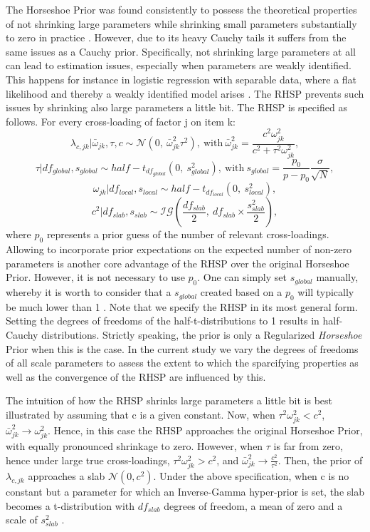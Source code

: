 \documentclass[]{interact}
\theoremstyle{plain}%
\theoremstyle{definition}
\theoremstyle{remark}
\begin{document}
The Horseshoe Prior was found consistently to possess the theoretical
properties of not shrinking large parameters while shrinking small
parameters substantially to zero in practice
\citep{carvalho_horseshoe_2010, polson_shrink_2010, datta_asymptotic_2013, van_der_pas_horseshoe_2014}.
However, due to its heavy Cauchy tails it suffers from the same issues
as a Cauchy prior. Specifically, not shrinking large parameters at all
can lead to estimation issues, especially when parameters are weakly
identified. This happens for instance in logistic regression with
separable data, where a flat likelihood and thereby a weakly identified
model arises \citep{ghosh_use_2018}. The RHSP prevents such issues by
shrinking also large parameters a little bit. The RHSP is specified as
follows. For every cross-loading of factor j on item k:
\[\lambda_{c,jk} | \bar{\omega}_{jk}, \tau, c\sim \mathcal{N}(0, \ \bar{\omega}^2_{jk} \tau^2), \ \text{with} \ \bar{\omega}^2_{jk} = \frac{c^2\omega_{jk}^2}{c^2 + \tau^2 \omega_{jk}^2},\]
\[\tau | df_{global}, s_{global} \sim half-t_{df_{global}}(0,\  s_{global}^2), \ \text{with} \  s_{global} = \frac{p_0}{p-p_0}\frac{\sigma}{\sqrt{N}},\]
\[\omega_{jk}| df_{local}, s_{local} \sim half-t_{df_{local}}(0, \ s_{local}^2),\]
\[c^2 | df_{slab}, s_{slab} \sim \mathcal{IG}(\frac{df_{slab}}{2}, \  df_{slab} \times \frac{s_{slab}^2}{2}),\]
where \(p_0\) represents a prior guess of the number of relevant
cross-loadings. Allowing to incorporate prior expectations on the
expected number of non-zero parameters is another core advantage of the
RHSP over the original Horseshoe Prior. However, it is not necessary to
use \(p_0\). One can simply set \(s_{global}\) manually, whereby it is
worth to consider that a \(s_{global}\) created based on a \(p_0\) will
typically be much lower than 1 \citep{piironen_sparsity_2017}. Note that
we specify the RHSP in its most general form. Setting the degrees of
freedoms of the half-t-distributions to 1 results in half-Cauchy
distributions. Strictly speaking, the prior is only a Regularized
\emph{Horseshoe} Prior when this is the case. In the current study we
vary the degrees of freedoms of all scale parameters to assess the
extent to which the sparcifying properties as well as the convergence of
the RHSP are influenced by this.

The intuition of how the RHSP shrinks large parameters a little bit is
best illustrated by assuming that c is a given constant. Now, when
\(\tau^2 \omega^2_{jk} < c^2\),
\(\bar{\omega}^2_{jk} \to \omega^2_{jk}\). Hence, in this case the RHSP
approaches the original Horseshoe Prior, with equally pronounced
shrinkage to zero. However, when \(\tau\) is far from zero, hence under
large true cross-loadings, \(\tau^2 \omega^2_{jk} > c^2\), and
\(\bar{\omega}^2_{jk} \to \frac{c^2}{\tau^2}\). Then, the prior of
\(\lambda_{c,jk}\) approaches a slab \(\mathcal{N}(0, c^2)\). Under the
above specification, when c is no constant but a parameter for which an
Inverse-Gamma hyper-prior is set, the slab becomes a t-distribution with
\(df_{slab}\) degrees of freedom, a mean of zero and a scale of
\(s_{slab}^2\) \citep{piironen_sparsity_2017}.
\end{document}
